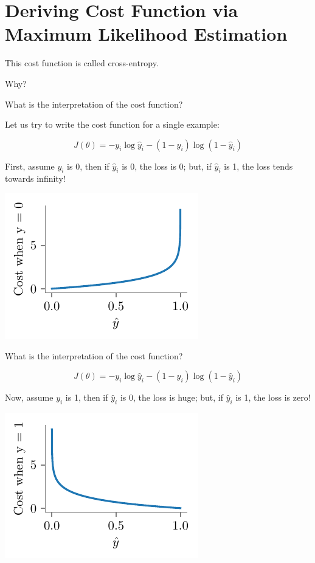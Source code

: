 \documentclass{beamer}
\begin{document}
\section{Deriving Cost Function via Maximum Likelihood Estimation}

\begin{frame}This cost function is called cross-entropy.

\pause Why?
\end{frame}

\begin{frame}What is the interpretation of the cost function?

\pause Let us try to write the cost function for a single example:

\pause $$J(\theta) = -y_i\log{\hat{y}_i} - (1-y_i)\log({1-\hat{y}_i})$$

\pause First, assume $y_i$ is 0, then if $\hat{y}_i$ is 0, the loss is 0; but, if $\hat{y}_i$ is 1, the loss tends towards infinity!

	\includegraphics[scale=0.7]{../assets/logistic-regression/figures/logistic-cross-cost-0}

\end{frame}

\begin{frame}What is the interpretation of the cost function?

 $$J(\theta) = -y_i\log{\hat{y}_i} - (1-y_i)\log({1-\hat{y}_i})$$

\pause Now, assume $y_i$ is 1, then if $\hat{y}_i$ is 0, the loss is huge; but, if $\hat{y}_i$ is 1, the loss is zero!

\includegraphics[scale=0.7]{../assets/logistic-regression/figures/logistic-cross-cost-1}

\end{frame}
\end{document}
